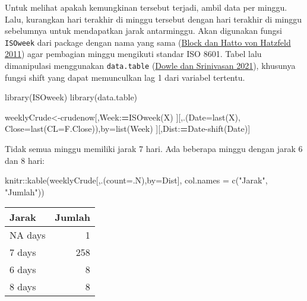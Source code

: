 \documentclass[
]{book}
\newenvironment{Shaded}{\begin{snugshade}}{\end{snugshade}}
\newcommand{\AttributeTok}[1]{\textcolor[rgb]{0.77,0.63,0.00}{#1}}
\newcommand{\ErrorTok}[1]{\textcolor[rgb]{0.64,0.00,0.00}{\textbf{#1}}}
\newcommand{\FunctionTok}[1]{\textcolor[rgb]{0.00,0.00,0.00}{#1}}
\newcommand{\NormalTok}[1]{#1}
\newcommand{\OtherTok}[1]{\textcolor[rgb]{0.56,0.35,0.01}{#1}}
\newcommand{\SpecialCharTok}[1]{\textcolor[rgb]{0.00,0.00,0.00}{#1}}
\newcommand{\StringTok}[1]{\textcolor[rgb]{0.31,0.60,0.02}{#1}}
\begin{document}
Untuk melihat apakah kemungkinan tersebut terjadi, ambil data per minggu. Lalu, kurangkan hari terakhir di minggu tersebut dengan hari terakhir di minggu sebelumnya untuk mendapatkan jarak antarminggu. Akan digunakan fungsi \texttt{ISOweek} dari package dengan nama yang sama (\protect\hyperlink{ref-R-ISOweek}{Block dan Hatto von Hatzfeld 2011}) agar pembagian minggu mengikuti standar ISO 8601. Tabel lalu dimanipulasi menggunakan \texttt{data.table} (\protect\hyperlink{ref-R-data.table}{Dowle dan Srinivasan 2021}), khusunya fungsi shift yang dapat memunculkan lag 1 dari variabel tertentu.

\begin{Shaded}
\begin{Highlighting}[]
\FunctionTok{library}\NormalTok{(ISOweek)}
\FunctionTok{library}\NormalTok{(data.table)}

\NormalTok{weeklyCrude}\OtherTok{\textless{}{-}}\NormalTok{crudenow[,Week}\SpecialCharTok{:}\ErrorTok{=}\FunctionTok{ISOweek}\NormalTok{(X)}
\NormalTok{         ][,.(}\AttributeTok{Date=}\FunctionTok{last}\NormalTok{(X),}
            \AttributeTok{Close=}\FunctionTok{last}\NormalTok{(}\StringTok{\textasciigrave{}}\AttributeTok{CL=F.Close}\StringTok{\textasciigrave{}}\NormalTok{)),by}\OtherTok{=}\FunctionTok{list}\NormalTok{(Week)}
\NormalTok{           ][,Dist}\SpecialCharTok{:}\ErrorTok{=}\NormalTok{Date}\SpecialCharTok{{-}}\FunctionTok{shift}\NormalTok{(Date)]}
\end{Highlighting}
\end{Shaded}

Tidak semua minggu memiliki jarak 7 hari. Ada beberapa minggu dengan jarak 6 dan 8 hari:

\begin{Shaded}
\begin{Highlighting}[]
\NormalTok{knitr}\SpecialCharTok{::}\FunctionTok{kable}\NormalTok{(weeklyCrude[,.(}\AttributeTok{count=}\NormalTok{.N),}\AttributeTok{by=}\NormalTok{Dist], }\AttributeTok{col.names =} \FunctionTok{c}\NormalTok{(}\StringTok{"Jarak"}\NormalTok{,}
                                                              \StringTok{"Jumlah"}\NormalTok{))}
\end{Highlighting}
\end{Shaded}

\begin{tabular}{l|r}
\hline
Jarak & Jumlah\\
\hline
NA days & 1\\
\hline
7 days & 258\\
\hline
6 days & 8\\
\hline
8 days & 8\\
\hline
\end{tabular}
\end{document}
